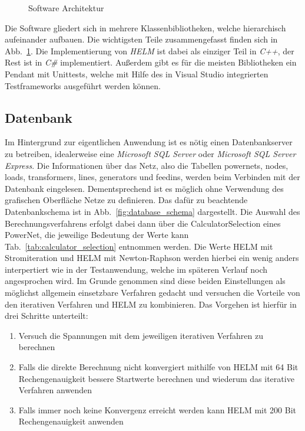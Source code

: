 \documentclass[12pt,a4paper]{article}
\newcommand{\reffig}[1]{{Abb.~\ref{#1}}}
\newcommand{\reftab}[1]{{Tab.~\ref{#1}}}
\begin{document}
	\begin{figure}
		\centering
		
		\caption{Software Architektur}
		\label{fig:software_architecture}
	\end{figure}
	Die Software gliedert sich in mehrere Klassenbibliotheken, welche hierarchisch aufeinander aufbauen. Die wichtigsten Teile zusammengefasst finden sich in \reffig{fig:software_architecture}. Die Implementierung von \emph{HELM} ist dabei als einziger Teil in \emph{C++}, der Rest ist in \emph{C\#} implementiert. Außerdem gibt es für die meisten Bibliotheken ein Pendant mit Unittests, welche mit Hilfe des in Visual Studio integrierten Testframeworks ausgeführt werden können.
	
	\subsection{Datenbank}
	Im Hintergrund zur eigentlichen Anwendung ist es nötig einen Datenbankserver zu betreiben, idealerweise eine \emph{Microsoft SQL Server} oder \emph{Microsoft SQL Server Express}. Die Informationen über das Netz, also die Tabellen powernets, nodes, loads, transformers, lines, generators und feedins, werden beim Verbinden mit der Datenbank eingelesen. Dementsprechend ist es möglich ohne Verwendung des grafischen Oberfläche Netze zu definieren. Das dafür zu beachtende Datenbankschema ist in \reffig{fig:database_schema} dargestellt. Die Auswahl des Berechnungsverfahrens erfolgt dabei dann über die CalculatorSelection eines PowerNet, die jeweilige Bedeutung der Werte kann \reftab{tab:calculator_selection} entnommen werden. Die Werte HELM mit Stromiteration und HELM mit Newton-Raphson werden hierbei ein wenig anders interpertiert wie in der Testanwendung, welche im späteren Verlauf noch angesprochen wird. Im Grunde genommen sind diese beiden Einstellungen als möglichst allgemein einsetzbare Verfahren gedacht und versuchen die Vorteile von den iterativen Verfahren und HELM zu kombinieren. Das Vorgehen ist hierfür in drei Schritte unterteilt:
	\begin{enumerate}
		\item Versuch die Spannungen mit dem jeweiligen iterativen Verfahren zu berechnen
		\item Falls die direkte Berechnung nicht konvergiert mithilfe von HELM mit 64 Bit Rechengenauigkeit bessere Startwerte berechnen und wiederum das iterative Verfahren anwenden
		\item Falls immer noch keine Konvergenz erreicht werden kann HELM mit 200 Bit Rechengenauigkeit anwenden
	\end{enumerate}
	
\end{document}
